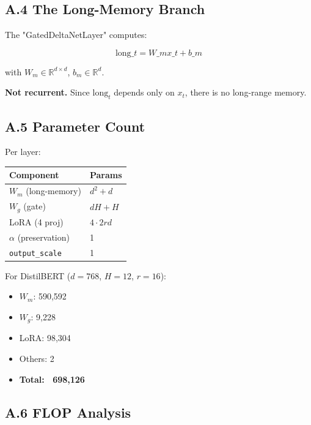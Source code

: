 \subsection{A.4 The Long-Memory Branch}

The "GatedDeltaNetLayer" computes:

\[
\text{long}\_t = W\_m x\_t + b\_m
\tag{A.4}
\]

with $W_m \in \mathbb{R}^{d \times d}$, $b_m \in \mathbb{R}^d$.

\textbf{Not recurrent.} Since $\text{long}_t$ depends only on $x_t$, there is no 
long-range memory.

\subsection{A.5 Parameter Count}

Per layer:

\begin{table}[H]
\centering
\small
\begin{tabular}{ll}
\toprule
\textbf{Component} & \textbf{Params} \\
\midrule
$W_m$ (long-memory) & $d^2 + d$ \\
$W_g$ (gate) & $d H + H$ \\
LoRA (4 proj) & $4 \cdot 2 r d$ \\
$\alpha$ (preservation) & 1 \\
\texttt{output\_scale} & 1 \\
\bottomrule
\end{tabular}
\end{table}

For DistilBERT ($d = 768$, $H = 12$, $r = 16$):
\begin{itemize}
\item $W_m$: 590,592
\item $W_g$: 9,228
\item LoRA: 98,304
\item Others: 2
\item \textbf{Total: ~698,126}

\end{itemize}
\subsection{A.6 FLOP Analysis}

